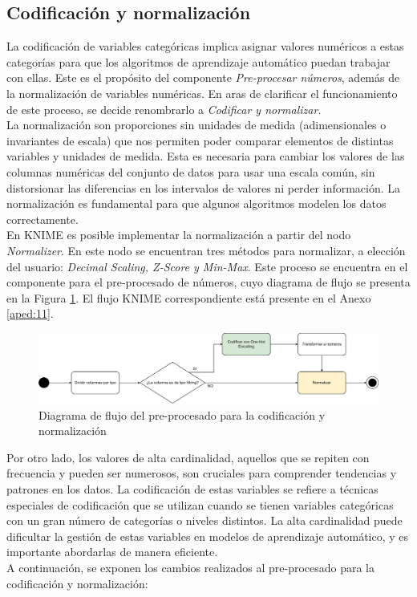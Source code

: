\subsection{Codificación y normalización}
La codificación de variables categóricas implica asignar valores numéricos a estas categorías para que los algoritmos de aprendizaje automático puedan trabajar con ellas. Este es el propósito del componente \textit{Pre-procesar números}, además de la normalización de variables numéricas. En aras de clarificar el funcionamiento de este proceso, se decide renombrarlo a \textit{Codificar y normalizar}.\\
La normalización son proporciones sin unidades de medida (adimensionales o invariantes de escala) que nos permiten poder comparar elementos de distintas variables y unidades de medida. Esta es necesaria para cambiar los valores de las columnas numéricas del conjunto de datos para usar una escala común, sin distorsionar las diferencias en los intervalos de valores ni perder información. La normalización es fundamental para que algunos algoritmos modelen los datos correctamente. \\
En KNIME es posible implementar la normalización a partir del nodo \textit{Normalizer}. En este nodo se encuentran tres métodos para normalizar, a elección del usuario: \textit{Decimal Scaling, Z-Score y Min-Max}. Este proceso se encuentra en el componente para el pre-procesado de números, cuyo diagrama de flujo se presenta en la Figura \ref{fig:number-preprocs}. El flujo KNIME correspondiente está presente en el Anexo \ref{aped:11}. 

\begin{figure}[H]
	\centering
	\includegraphics[width=1\linewidth]{"figuras/capi 2/preprocesado/number preprocs.drawio"}
	\caption{Diagrama de flujo del pre-procesado para la codificación y normalización}
	\label{fig:number-preprocs}
\end{figure}
Por otro lado, los valores de alta cardinalidad, aquellos que se repiten con frecuencia y pueden ser numerosos, son cruciales para comprender tendencias y patrones en los datos. La codificación de estas variables se refiere a técnicas especiales de codificación que se utilizan cuando se tienen variables categóricas con un gran número de categorías o niveles distintos. La alta cardinalidad puede dificultar la gestión de estas variables en modelos de aprendizaje automático, y es importante abordarlas de manera eficiente. \\ 
A continuación, se exponen los cambios realizados al pre-procesado para la codificación y normalización:

